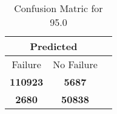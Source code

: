 \begin{table}[] 
\label{Table: Prediction Accuracy-DMD95.0OnlySunEKF-combinationReflection-Reflection} 
\caption{Confusion Matric for 95.0} 
\centering 
\begin{tabular} 
 {@{}ccc@{}} 
\toprule 
\multicolumn{2}{c}{\textbf{Predicted}}
 \\ \midrule 
\multicolumn{1}{|c|}{Failure} & 
\multicolumn{1}{c|}{No Failure}
 \\ \midrule 
\multicolumn{1}{|c|}{\color{green}\textbf{110923}} & 
\multicolumn{1}{c|}{\color{red}\textbf{5687}}
 \\ \midrule 
\multicolumn{1}{|c|}{\color{red}\textbf{2680}} & 
\multicolumn{1}{c|}{\color{green}\textbf{50838}}
 \\ \bottomrule 
\end{tabular} 
\end{table} 
